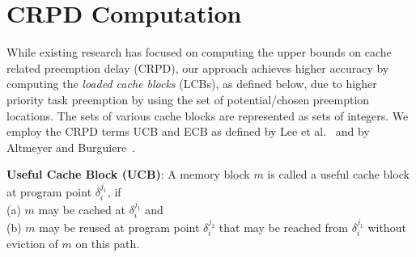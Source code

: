 \vspace{-5pt}
\section{CRPD Computation}\label{sec:crpd_computation}

While existing research has focused on computing the upper bounds on cache related preemption delay (CRPD), our approach achieves higher accuracy by computing the \emph{loaded cache blocks} (LCBs), as defined below, due to higher priority task preemption by using the set of potential/chosen preemption locations.  The sets of various cache blocks are represented as sets of integers.  We employ the CRPD terms UCB and ECB as defined by Lee et al.~\cite{lee:98} and by Altmeyer and Burguiere~\cite{altmeyer:11c}.

\begin{definition}
\textbf{Useful Cache Block (UCB)}: A memory block $m$ is called a useful cache block at program point \begin{math}\delta_{i}^{j_{1}}\end{math}, if \\(a) $m$ may be cached at \begin{math}\delta_{i}^{j_{1}}\end{math} and \\(b) $m$ may be reused at program point \begin{math}\delta_{i}^{j_{2}}\end{math} that may be reached from \begin{math}\delta_{i}^{j_{1}}\end{math} without eviction of $m$ on this path.
\end{definition}

